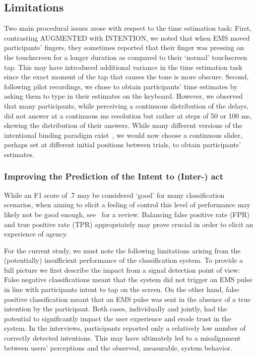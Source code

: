 \subsection{Limitations}
Two main procedural issues arose with respect to the time estimation task: First, contrasting AUGMENTED with INTENTION, we noted that when EMS moved participants' fingers, they sometimes reported that their finger was pressing on the touchscreen for a longer duration as compared to their `normal' touchscreen tap. This may have introduced additional variance in the time estimation task since the exact moment of the tap that causes the tone is more obscure. Second, following pilot recordings, we chose to obtain participants' time estimates by asking them to type in their estimates on the keyboard. However, we observed that many participants, while perceiving a continuous distribution of the delays, did not answer at a continuous ms resolution but rather at steps of 50 or 100 ms, skewing the distribution of their answers. While many different versions of the intentional binding paradigm exist~\cite{Moore2012-dk}, we would now choose a continuous slider, perhaps set at different initial positions between trials, to obtain participants' estimates.

\subsubsection{Improving the Prediction of the Intent to (Inter-) act}
While an F1 score of .7 may be considered `good' for many classification scenarios, when aiming to elicit a feeling of control this level of performance may likely not be good enough, see~\citet{Papenmeier2022-oi} for a review. Balancing false positive rate (FPR) and true positive rate (TPR) appropriately may prove crucial in order to elicit an experience of agency.

For the current study, we must note the following limitations arising from the (potentially) insufficient performance of the classification system. To provide a full picture we first describe the impact from a signal detection point of view: False negative classifications meant that the system did not trigger an EMS pulse in line with participants intent to tap on the screen. On the other hand, false positive classification meant that an EMS pulse was sent in the absence of a true intention by the participant. Both cases, individually and jointly, had the potential to significantly impact the user experience and erode trust in the system. In the interviews, participants reported only a relatively low number of correctly detected intentions. This may have ultimately led to a misalignment between users' perceptions and the observed, measurable, system behavior. 


